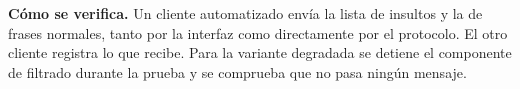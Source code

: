 \textbf{Cómo se verifica.} Un cliente automatizado envía la lista de insultos y la de frases normales, tanto por la interfaz como directamente por el protocolo. El otro cliente registra lo que recibe. Para la variante degradada se detiene el componente de filtrado durante la prueba y se comprueba que no pasa ningún mensaje.
